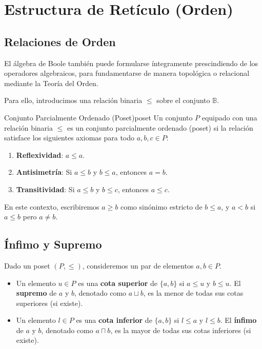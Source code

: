 \chapter{Estructura de Retículo (Orden)}

\section{Relaciones de Orden}
El álgebra de Boole también puede formularse íntegramente prescindiendo de los operadores algebraicos, para fundamentarse de manera topológica o relacional mediante la Teoría del Orden. 

Para ello, introducimos una relación binaria $\le$ sobre el conjunto $\mathbb{B}$. 

\begin{definicion}{Conjunto Parcialmente Ordenado (Poset)}{poset}
Un conjunto $P$ equipado con una relación binaria $\le$ es un conjunto parcialmente ordenado (poset) si la relación satisface los siguientes axiomas para todo $a, b, c \in P$:
\begin{enumerate}
    \item \textbf{Reflexividad}: $a \le a$.
    \item \textbf{Antisimetría}: Si $a \le b$ y $b \le a$, entonces $a = b$.
    \item \textbf{Transitividad}: Si $a \le b$ y $b \le c$, entonces $a \le c$.
\end{enumerate}
\end{definicion}

En este contexto, escribiremos $a \ge b$ como sinónimo estricto de $b \le a$, y $a < b$ si $a \le b$ pero $a \ne b$.

\section{Ínfimo y Supremo}

Dado un poset $(P, \le)$, consideremos un par de elementos $a, b \in P$. 
\begin{itemize}
    \item Un elemento $u \in P$ es una \textbf{cota superior} de $\{a, b\}$ si $a \le u$ y $b \le u$. El \textbf{supremo} de $a$ y $b$, denotado como $a \sqcup b$, es la menor de todas sus cotas superiores (si existe).
    \item Un elemento $l \in P$ es una \textbf{cota inferior} de $\{a, b\}$ si $l \le a$ y $l \le b$. El \textbf{ínfimo} de $a$ y $b$, denotado como $a \sqcap b$, es la mayor de todas sus cotas inferiores (si existe).
\end{itemize}

